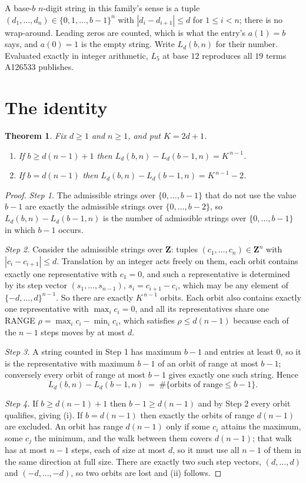 \documentclass[11pt,a4paper]{article}
\theoremstyle{plain}
\newtheorem{theorem}{Theorem}
\theoremstyle{definition}
\begin{document}
A base-$b$ $n$-digit string in this family's sense is a tuple
$(d_1,\dots,d_n)\in\{0,1,\dots,b-1\}^{n}$ with $|d_i-d_{i+1}|\le d$ for $1\le i<n$; there
is no wrap-around. Leading zeros are counted, which is what the entry's $a(1)=b$ says, and
$a(0)=1$ is the empty string. Write $L_d(b,n)$ for their number. Evaluated exactly in integer
arithmetic, $L_{5}$ at base $12$ reproduces all $19$ terms A126533 publishes.

\section{The identity}

\begin{theorem}
Fix $d\ge1$ and $n\ge1$, and put $K=2d+1$.
\begin{enumerate}
\item[(i)] If $b\ge d(n-1)+1$ then $L_d(b,n)-L_d(b-1,n)=K^{\,n-1}$.
\item[(ii)] If $b=d(n-1)$ then $L_d(b,n)-L_d(b-1,n)=K^{\,n-1}-2$.
\end{enumerate}
\end{theorem}

\begin{proof}
\emph{Step 1.} The admissible strings over $\{0,\dots,b-1\}$ that do not use the value $b-1$
are exactly the admissible strings over $\{0,\dots,b-2\}$, so $L_d(b,n)-L_d(b-1,n)$ is the
number of admissible strings over $\{0,\dots,b-1\}$ in which $b-1$ occurs.

\emph{Step 2.} Consider the admissible strings over $\mathbf{Z}$: tuples
$(c_1,\dots,c_n)\in\mathbf{Z}^{n}$ with $|c_i-c_{i+1}|\le d$. Translation by an integer acts
freely on them, each orbit contains exactly one representative with $c_1=0$, and such a
representative is determined by its step vector $(s_1,\dots,s_{n-1})$, $s_i=c_{i+1}-c_i$,
which may be any element of $\{-d,\dots,d\}^{n-1}$. So there are exactly $K^{\,n-1}$ orbits.
Each orbit also contains exactly one representative with $\max_i c_i=0$, and all its
representatives share one RANGE $\rho=\max_ic_i-\min_ic_i$, which satisfies
$\rho\le d(n-1)$ because each of the $n-1$ steps moves by at most $d$.

\emph{Step 3.} A string counted in Step 1 has maximum $b-1$ and entries at least $0$, so it is
the representative with maximum $b-1$ of an orbit of range at most $b-1$; conversely every orbit
of range at most $b-1$ gives exactly one such string. Hence
\[
L_d(b,n)-L_d(b-1,n)\;=\;\#\{\text{orbits of range}\le b-1\} .
\]

\emph{Step 4.} If $b\ge d(n-1)+1$ then $b-1\ge d(n-1)$ and by Step 2 every orbit qualifies,
giving (i). If $b=d(n-1)$ then exactly the orbits of range $d(n-1)$ are excluded. An orbit has
range $d(n-1)$ only if some $c_i$ attains the maximum, some $c_j$ the minimum, and the walk
between them covers $d(n-1)$; that walk has at most $n-1$ steps, each of size at most $d$, so it
must use all $n-1$ of them in the same direction at full size. There are exactly two such step
vectors, $(d,\dots,d)$ and $(-d,\dots,-d)$, so two orbits are lost and (ii) follows.
\end{proof}
\end{document}
